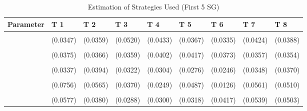 \begin{table}[!h]
\centering
\caption{Estimation of Strategies Used (First 5 SG)}
\centering
\begin{tabular}[t]{lllllllll}
\toprule
Parameter & T 1 & T 2 & T 3 & T 4 & T 5 & T 6 & T 7 & T 8\\
\midrule
\cellcolor{gray!10}{gamma} & \cellcolor{gray!10}{0.7016***} & \cellcolor{gray!10}{0.6774***} & \cellcolor{gray!10}{0.9157***} & \cellcolor{gray!10}{0.8493***} & \cellcolor{gray!10}{0.7597***} & \cellcolor{gray!10}{0.7842***} & \cellcolor{gray!10}{0.7255***} & \cellcolor{gray!10}{0.8044***}\\
 & (0.0347) & (0.0359) & (0.0520) & (0.0433) & (0.0367) & (0.0335) & (0.0424) & (0.0388)\\
\cellcolor{gray!10}{AD} & \cellcolor{gray!10}{0.3429***} & \cellcolor{gray!10}{0.2924***} & \cellcolor{gray!10}{0.7202***} & \cellcolor{gray!10}{0.6546***} & \cellcolor{gray!10}{0.6302***} & \cellcolor{gray!10}{0.6521***} & \cellcolor{gray!10}{0.3132***} & \cellcolor{gray!10}{0.3268***}\\
 & (0.0375) & (0.0366) & (0.0359) & (0.0402) & (0.0417) & (0.0373) & (0.0357) & (0.0354)\\
\cellcolor{gray!10}{AC} & \cellcolor{gray!10}{0.1337***} & \cellcolor{gray!10}{0.2379***} & \cellcolor{gray!10}{0.1737***} & \cellcolor{gray!10}{0.1562***} & \cellcolor{gray!10}{0.1388***} & \cellcolor{gray!10}{0.1240***} & \cellcolor{gray!10}{0.2170***} & \cellcolor{gray!10}{0.1964***}\\
\addlinespace
 & (0.0337) & (0.0394) & (0.0322) & (0.0304) & (0.0276) & (0.0246) & (0.0348) & (0.0370)\\
\cellcolor{gray!10}{G} & \cellcolor{gray!10}{0.1132} & \cellcolor{gray!10}{0.1375*} & \cellcolor{gray!10}{0.0487} & \cellcolor{gray!10}{0.0004} & \cellcolor{gray!10}{0.0531} & \cellcolor{gray!10}{0.0000} & \cellcolor{gray!10}{0.0481} & \cellcolor{gray!10}{0.0194}\\
 & (0.0756) & (0.0565) & (0.0370) & (0.0249) & (0.0487) & (0.0126) & (0.0561) & (0.0510)\\
\cellcolor{gray!10}{TFT} & \cellcolor{gray!10}{0.1903***} & \cellcolor{gray!10}{0.0834*} & \cellcolor{gray!10}{0.0281} & \cellcolor{gray!10}{0.1169***} & \cellcolor{gray!10}{0.0412} & \cellcolor{gray!10}{0.1197**} & \cellcolor{gray!10}{0.1629**} & \cellcolor{gray!10}{0.1685***}\\
 & (0.0577) & (0.0380) & (0.0288) & (0.0300) & (0.0318) & (0.0417) & (0.0539) & (0.0503)\\

\end{tabular}
\end{table}
